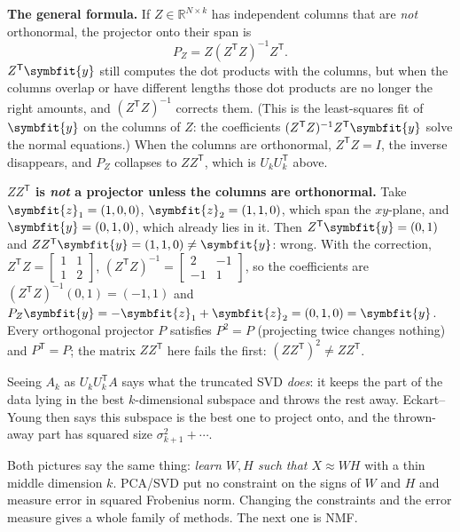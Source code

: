 \documentclass[11pt]{article}
\newcommand{\bm}[1]{\symbfit{#1}}
\newcommand{\R}{\mathbb{R}}
\newcommand{\T}{^{\mathsf T}}
\begin{document}
\textbf{The general formula.} If $Z\in\R^{N\times k}$ has independent columns that are \emph{not} orthonormal, the projector onto
their span is
\[
P_Z=Z(Z\T Z)^{-1}Z\T .
\]
$Z\T\bm y$ still computes the dot products with the columns, but when the columns overlap or have different lengths those dot
products are no longer the right amounts, and $(Z\T Z)^{-1}$ corrects them. (This is the least-squares fit of $\bm y$ on the columns of
$Z$: the coefficients $(Z\T Z)^{-1}Z\T\bm y$ solve the normal equations.) When the columns are orthonormal, $Z\T Z=I$, the inverse disappears, and
$P_Z$ collapses to $ZZ\T$, which is $U_kU_k\T$ above.

\begin{careful}
\textbf{$ZZ\T$ is \emph{not} a projector unless the columns are orthonormal.} Take $\bm z_1=(1,0,0)$, $\bm z_2=(1,1,0)$, which span the $xy$-plane,
and $\bm y=(0,1,0)$, which already lies in it. Then $Z\T\bm y=(0,1)$ and $ZZ\T\bm y=(1,1,0)\ne\bm y$: wrong. With the correction,
$Z\T Z=\begin{bmatrix}1&1\\1&2\end{bmatrix}$, $(Z\T Z)^{-1}=\begin{bmatrix}2&-1\\-1&1\end{bmatrix}$, so the coefficients are $(Z\T Z)^{-1}(0,1)=(-1,1)$ and
$P_Z\bm y=-\bm z_1+\bm z_2=(0,1,0)=\bm y$. Every orthogonal projector $P$ satisfies $P^2=P$ (projecting twice changes nothing) and
$P\T=P$; the matrix $ZZ\T$ here fails the first: $(ZZ\T)^2\ne ZZ\T$.
\end{careful}

\begin{intuition}
Seeing $A_k$ as $U_kU_k\T A$ says what the truncated SVD \emph{does}: it keeps the part of the data lying in the best $k$-dimensional
subspace and throws the rest away. Eckart--Young then says this subspace is the best one to project onto, and the thrown-away part
has squared size $\sigma_{k+1}^2+\cdots$.
\end{intuition}

\begin{intuition}
Both pictures say the same thing: \emph{learn $W,H$ such that $X\approx WH$} with a thin
middle dimension $k$. PCA/SVD put no constraint on the signs of $W$ and $H$ and measure
error in squared Frobenius norm. Changing the constraints and the error measure gives a
whole family of methods. The next one is NMF.
\end{intuition}
\end{document}
